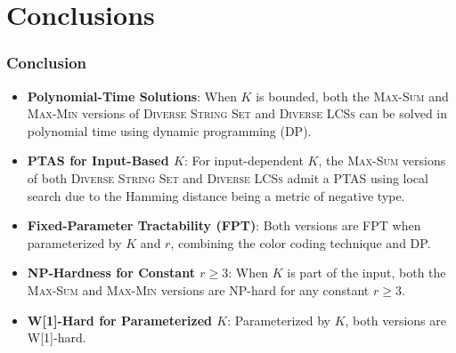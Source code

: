 \documentclass{beamer}
\begin{document}
\section*{Conclusions}
\begin{frame}
    \frametitle{Conclusion}

    \begin{itemize}
        \item \textbf{Polynomial-Time Solutions}: When \( K \) is bounded, both the \textsc{Max-Sum} and \textsc{Max-Min} versions of \textsc{Diverse String Set} and \textsc{Diverse LCSs} can be solved in polynomial time using dynamic programming (DP).
        \item \textbf{PTAS for Input-Based \( K \)}: For input-dependent \( K \), the \textsc{Max-Sum} versions of both \textsc{Diverse String Set} and \textsc{Diverse LCSs} admit a PTAS using local search due to the Hamming distance being a metric of negative type.
        \item \textbf{Fixed-Parameter Tractability (FPT)}: Both versions are FPT when parameterized by \( K \) and \( r \), combining the color coding technique and DP.
        \item \textbf{NP-Hardness for Constant \( r \ge 3 \)}: When \( K \) is part of the input, both the \textsc{Max-Sum} and \textsc{Max-Min} versions are NP-hard for any constant \( r \ge 3 \).
        \item \textbf{W[1]-Hard for Parameterized \( K \)}: Parameterized by \( K \), both versions are W[1]-hard.
    \end{itemize}

\end{frame}






\end{document}
